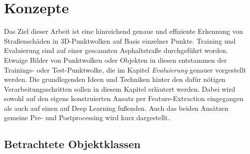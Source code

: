 
\chapter{Konzepte}

Das Ziel dieser Arbeit ist eine hinreichend genaue und effiziente Erkennung von Straßenschäden in 3D-Punktwolken auf Basis einzelner Punkte. Training und Evaluierung sind auf einer gescannten Asphaltstraße durchgeführt worden. Etwaige Bilder von Punktwolken oder Objekten in diesen entstammen der Trainings- oder Test-Punktwolke, die im Kapitel \textit{Evaluierung} genauer vorgestellt werden. Die grundlegenden Ideen und Techniken hinter den dafür nötigen Verarbeitungsschritten sollen in diesem Kapitel erläutert werden. Dabei wird sowohl auf den eigens konstruierten Ansatz per Feature-Extraction eingegangen als auch auf einen auf Deep Learning fußenden. Auch das beiden Ansätzen gemeine Pre- und Postprocessing wird kurz dargestellt.

\section{Betrachtete Objektklassen}

